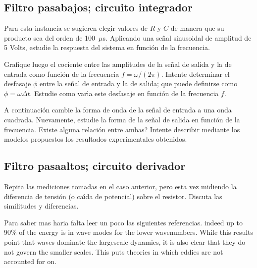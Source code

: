 \documentclass[laboratorio]{guia}
\begin{document}
\subsection{Filtro pasabajos; circuito integrador}

Para esta instancia se sugieren elegir valores de $R$ y $C$ de manera que 
su producto sea del orden de 100~$\mu$s. Aplicando una se\~nal sinusoidal de
amplitud de 5 Volts, estudie la respuesta del sistema en funci\'on de la
frecuencia. 

Grafique luego el cociente entre las amplitudes de la se\~nal de salida y
la de entrada como funci\'on de la frecuencia $f = \omega/(2\pi)$. Intente 
determinar el desfasaje $\phi$ entre la se\~nal de entrada y la de salida; que 
puede definirse como $\phi = \omega \Delta t$. Estudie como var\'\i a este 
desfasaje en funci\'on de la frecuencia $f$. 

A continuaci\'on cambie la forma de onda de la se\~nal de entrada a una 
onda cuadrada. Nuevamente, estudie la forma de la se\~nal de salida en 
funci\'on de la frecuencia. Existe alguna relaci\'on entre ambas? Intente
describir mediante los modelos propuestos los resultados experimentales 
obtenidos. 

\subsection{Filtro pasaaltos; circuito derivador}

Repita las mediciones tomadas en el caso anterior, pero esta vez midiendo 
la diferencia de tensi\'on (o ca\'\i da de potencial) sobre el resistor. 
Discuta las similitudes y diferencias. 

\begin{sabermas} Para saber mas haria falta leer un poco las siguientes
    referencias.  indeed up to 90\% of the energy is in wave modes for the
    lower wavenumbers. While this results point that waves dominate the
    largescale dynamics, it is also clear that they do not govern the smaller
    scales.  This puts theories in which eddies are not accounted for on.
\end{sabermas}

%  
\end{document}
